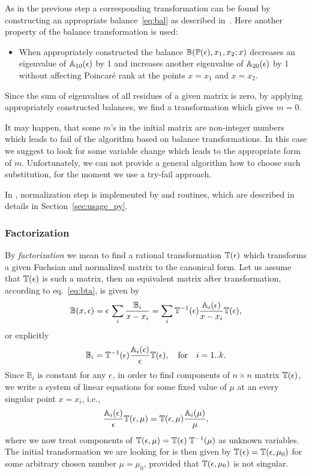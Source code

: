 \documentclass[12pt,a4paper]{article}
\def\M#1{\mathbb{#1}} %
\begin{document}
As in the previous step a corresponding transformation can be found by constructing an appropriate balance~\eqref{eq:bal} as described in~\cite[p.~11]{Lee15}.
Here another property of the balance transformation is used:
\begin{itemize}
  \item When appropriately constructed the balance $\M B(\M P(\eps), x_1, x_2; x)$ decreases an eigenvalue of $\M A_{10}(\eps)$ by 1 and increases another eigenvalue of $\M A_{20}(\eps)$ by 1 without affecting Poincar\'e rank at the points $x=x_1$ and $x=x_2$.
\end{itemize}
Since the sum of eigenvalues of all residues of a given matrix is zero, by applying appropriately constructed balances, we find a transformation which gives $m = 0$.

It may happen, that some $m$'s in the initial matrix are non-integer numbers which leads to fail of the algorithm based on balance transformations.
In this case we suggest to look for some variable change which leads to the appropriate form of $m$.
Unfortunately, we can not provide a general algorithm how to choose such substitution, for the moment we use a try-fail approach.

In \fuchsia, normalization step is implemented by  and  routines, which are described in details in Section~\ref{sec:usage_py}.


\subsubsection{Factorization}
\label{sec:fact}
By {\em factorization} we mean to find a rational transformation $\M T(\eps)$ which transforms a given Fuchsian and normalized matrix to the canonical form.
Let us assume that $\M T(\eps)$ is such a matrix, then an equivalent matrix after transformation, according to eq.~\eqref{eq:bta}, is given by
\begin{equation}
  \M B(x,\eps) = \eps\, \sum_i \frac{\M B_i}{x-x_i} = \sum_i \M T^{-1}(\eps) \frac{\M A_i(\eps)}{x-x_i} \M T(\eps),
\end{equation}
or explicitly
\begin{equation}
  \M B_i = \M T^{-1}(\eps) \frac{\M A_i(\eps)}{\eps} \M T(\eps), \quad \text{for} \quad i=1..k.
\end{equation}
Since $\M B_i$ is constant for any $\epsilon$, in order to find components of $n\times n$ matrix $\M T(\eps)$, we write a system of linear equations for some fixed value of $\mu$ at an every singular point $x=x_i$, i.e.,
\begin{equation}
  \frac{\M A_i(\eps)}{\eps} \M T(\eps,\mu) = \M T(\eps,\mu) \frac{\M A_i(\mu)}{\mu},
\end{equation}
where we now treat components of $\M T(\eps,\mu) = \M T(\eps) \; \M T^{-1}(\mu)$ as unknown variables.
The initial transformation we are looking for is then given by $\M T(\eps) = \M T(\eps,\mu_0)$ for some arbitrary chosen number $\mu = \mu_0$, provided that $\M T(\eps, \mu_0)$ is not singular.
\end{document}
